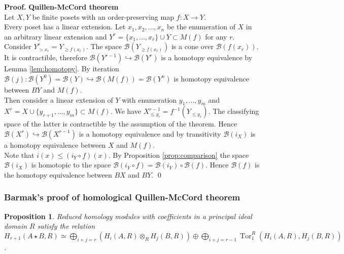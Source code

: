 \documentclass[english,12pt]{article}
\newcounter{stmcounter}[section]
\numberwithin{equation}{section}
\newtheorem{proposition}[stmcounter]{Proposition}
\theoremstyle{definition}
\theoremstyle{remark}
\newenvironment{pf}{\noindent\textbf{Proof.}}{\qed}
\renewcommand{\leq}{\leqslant}
\renewcommand{\geq}{\geqslant}
\begin{document}
\begin{pf} \textbf{Quillen-McCord theorem}\\
  Let $X, Y$ be finite posets with an order-preserving map $f : X \to Y$.\\

  Every poset has a linear extension. Let $x_1, x_2, \ldots, x_n$ be the enumeration of $X$ in an arbitrary linear extension and $Y^r = \{x_1,\ldots,x_r\} \cup Y \subset M(f)$ for any $r$.\\

  Consider $Y^r_{>x_r} = Y_{\geq f(x_r)}$. The space $\mathcal{B}(Y_{\geq f(x_r)})$ is a cone over $\mathcal{B}(f(x_r))$. It is contractible, therefore $\mathcal{B}(Y^{r-1}) \hookrightarrow \mathcal{B}(Y^{r})$ is a homotopy equivalence by Lemma \ref{lem:homotopy}. By iteration $\mathcal{B}(j) : \mathcal{B}(Y^{0}) = \mathcal{B}(Y) \hookrightarrow \mathcal{B}(M(f)) = \mathcal{B}(Y^n)$ is homotopy equivalence between $BY$ and $M(f)$.\\

  Then consider a linear extension of $Y$ with enumeration $y_1,\ldots,y_m$ and $X^r = X \cup \{y_{r+1},\ldots,y_m\} \subset M(f)$. We have $X^{r-1}_{\leq y_r} = f^{-1}(Y_{\leqslant y_r})$. The classifying space of the latter is contractible by the assumption of the theorem. Hence $\mathcal{B}(X^{r}) \hookrightarrow \mathcal{B}(X^{r-1})$ is a homotopy equivalence and by transitivity $\mathcal{B}(i_X)$ is a homotopy equivalence between $X$ and $M(f)$.\\

  Note that $i(x) \leqslant (i_Y \circ f)(x)$. By Proposition \ref{prop:comparison} the space $\mathcal{B}(i_X)$ is homotopic to the space $\mathcal{B}(i_Y \circ f) = \mathcal{B}(i_Y) \circ \mathcal{B}(f)$. Hence $\mathcal{B}(f)$ is the homotopy equivalence between $BX$ and $BY$.
\end{pf}

\subsubsection{Barmak's proof of homological Quillen-McCord theorem}

\begin{proposition} {\cite[Lemma 2.1]{Milnor56}}
  \label{prop:kunneth}
  Reduced homology modules with coefficients in a principal ideal domain $R$ satisfy the relation
  $H_{r+1}(A \star B, R) \simeq \bigoplus_{i+j=r}(H_i(A,R) \otimes_R H_j(B,R)) \oplus \bigoplus_{i+j=r-1} \operatorname{Tor}_1^R(H_i(A,R),H_j(B,R))$.
\end{proposition}
\end{document}
